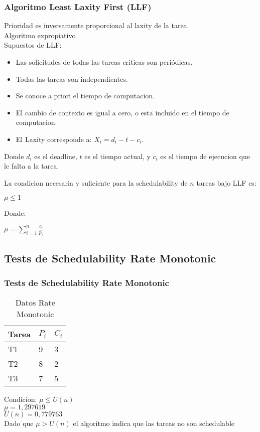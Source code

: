 \documentclass[xcolor=table]{beamer}
\begin{document}
\begin{frame} 
\frametitle{Algoritmo Least Laxity First (LLF)} 

Prioridad es inversamente proporcional al laxity de la tarea. \\
Algoritmo expropiativo\\
Supuestos de LLF:
\begin{itemize}
\item Las solicitudes de todas las tareas críticas son periódicas.
\item Todas las tareas son independientes.
\item Se conoce a priori el tiempo de computacion.
\item El cambio de contexto es igual a cero, o esta incluido en el tiempo de computacion.
\item El Laxity corresponde a: $X_i = d_i - t - c_i$.
\end{itemize} 

Donde $d_i$ es el deadline, $t$ es el tiempo actual, y $c_i$ es el tiempo de ejecucion que le falta a la tarea.

La condicion necesaria y suficiente para la schedulability de $n$ tareas bajo LLF es:
\begin{center}
$\mu \leq 1$
\end{center}

Donde:
\begin{center}
$\mu = \sum_{i=1}^{n}\frac{c_i}{p_i}$
\end{center}

\end{frame}

\subsection{Tests de Schedulability  Rate Monotonic } 

\begin{frame} 
\frametitle{Tests de Schedulability  Rate Monotonic } 
\begin{table} 
\centering 
\begin{tabular}{|l|l|l|} 
\hline 
\cellcolor{lightgray}Tarea & \cellcolor{lightgray}$P_i$ & \cellcolor{lightgray}$C_i$ \\ \hline 
T1   & 9  &  3\\ \hline 
T2   & 8  &  2\\ \hline 
T3   & 7  &  5\\ \hline 
\end{tabular} 
\caption{Datos  Rate Monotonic } 
\end{table} 
Condicion: $\mu \leq U(n)$ \\ 
$\mu =  1,297619 $ \\ 
$U(n) =  0,779763 $ \\ 
Dado que $\mu>U(n)$ el algoritmo indica que las tareas no son schedulable \\ 
\end{frame} 
\end{document}
